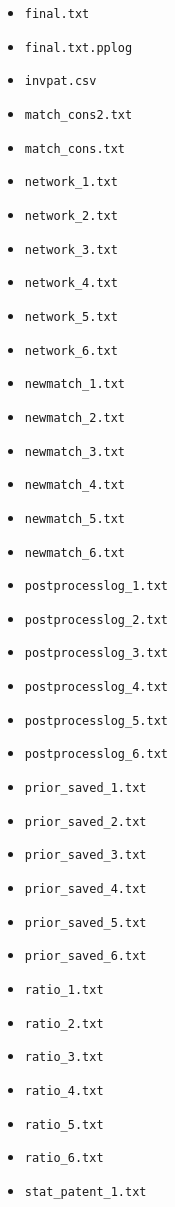 \documentclass{article}
\begin{document}
\begin{itemize}
\item \texttt{final.txt}
\item \texttt{final.txt.pplog}
\item \texttt{invpat.csv}
\item \texttt{match\_cons2.txt}
\item \texttt{match\_cons.txt}
\item \texttt{network\_1.txt}
\item \texttt{network\_2.txt}
\item \texttt{network\_3.txt}
\item \texttt{network\_4.txt}
\item \texttt{network\_5.txt}
\item \texttt{network\_6.txt}
\item \texttt{newmatch\_1.txt}
\item \texttt{newmatch\_2.txt}
\item \texttt{newmatch\_3.txt}
\item \texttt{newmatch\_4.txt}
\item \texttt{newmatch\_5.txt}
\item \texttt{newmatch\_6.txt}
\item \texttt{postprocesslog\_1.txt}
\item \texttt{postprocesslog\_2.txt}
\item \texttt{postprocesslog\_3.txt}
\item \texttt{postprocesslog\_4.txt}
\item \texttt{postprocesslog\_5.txt}
\item \texttt{postprocesslog\_6.txt}
\item \texttt{prior\_saved\_1.txt}
\item \texttt{prior\_saved\_2.txt}
\item \texttt{prior\_saved\_3.txt}
\item \texttt{prior\_saved\_4.txt}
\item \texttt{prior\_saved\_5.txt}
\item \texttt{prior\_saved\_6.txt}
\item \texttt{ratio\_1.txt}
\item \texttt{ratio\_2.txt}
\item \texttt{ratio\_3.txt}
\item \texttt{ratio\_4.txt}
\item \texttt{ratio\_5.txt}
\item \texttt{ratio\_6.txt}
\item \texttt{stat\_patent\_1.txt}

\end{itemize}
\end{document}
